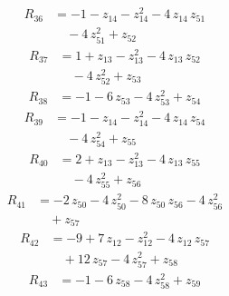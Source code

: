 \begin{equation*}\begin{aligned}
R_{36}&=-1 -z_{14} -z_{14}^{2} -4\,z_{14}\,z_{51} \\
&\quad -4\,z_{51}^{2} +z_{52}
\end{aligned}\end{equation*}
\begin{equation*}\begin{aligned}
R_{37}&=1 +z_{13} -z_{13}^{2} -4\,z_{13}\,z_{52} \\
&\quad -4\,z_{52}^{2} +z_{53}
\end{aligned}\end{equation*}
\begin{equation*}\begin{aligned}
R_{38}&=-1 -6\,z_{53} -4\,z_{53}^{2} +z_{54}
\end{aligned}\end{equation*}
\begin{equation*}\begin{aligned}
R_{39}&=-1 -z_{14} -z_{14}^{2} -4\,z_{14}\,z_{54} \\
&\quad -4\,z_{54}^{2} +z_{55}
\end{aligned}\end{equation*}
\begin{equation*}\begin{aligned}
R_{40}&=2 +z_{13} -z_{13}^{2} -4\,z_{13}\,z_{55} \\
&\quad -4\,z_{55}^{2} +z_{56}
\end{aligned}\end{equation*}
\begin{equation*}\begin{aligned}
R_{41}&=-2\,z_{50} -4\,z_{50}^{2} -8\,z_{50}\,z_{56} -4\,z_{56}^{2} \\
&\quad +z_{57}
\end{aligned}\end{equation*}
\begin{equation*}\begin{aligned}
R_{42}&=-9 +7\,z_{12} -z_{12}^{2} -4\,z_{12}\,z_{57} \\
&\quad +12\,z_{57} -4\,z_{57}^{2} +z_{58}
\end{aligned}\end{equation*}
\begin{equation*}\begin{aligned}
R_{43}&=-1 -6\,z_{58} -4\,z_{58}^{2} +z_{59}
\end{aligned}\end{equation*}
